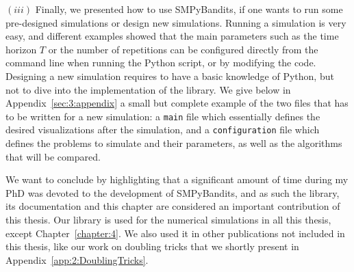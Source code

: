$(iii)$
Finally, we presented how to use SMPyBandits, if one wants to run some pre-designed simulations or design new simulations.
Running a simulation is very easy, and different examples showed that the main parameters such as the time horizon $T$ or the number of repetitions can be configured directly from the command line when running the Python script, or by modifying the code.
Designing a new simulation requires to have a basic knowledge of Python, but not to dive into the implementation of the library.
We give below in Appendix~\ref{sec:3:appendix} a small but complete example of the two files that has to be written for a new simulation: a \texttt{main} file which essentially defines the desired visualizations after the simulation, and a \texttt{configuration} file which defines the problems to simulate and their parameters, as well as the algorithms that will be compared.


We want to conclude by highlighting that a significant amount of time during my PhD was devoted to the development of SMPyBandits, and as such the library, its documentation and this chapter  are considered an important contribution of this thesis.
%
Our library is used for the numerical simulations in all this thesis, except Chapter~\ref{chapter:4}.
We also used it in other publications not included in this thesis, like our work on doubling tricks \cite{Besson2018DoublingTricks} that we shortly present in Appendix~\ref{app:2:DoublingTricks}.


